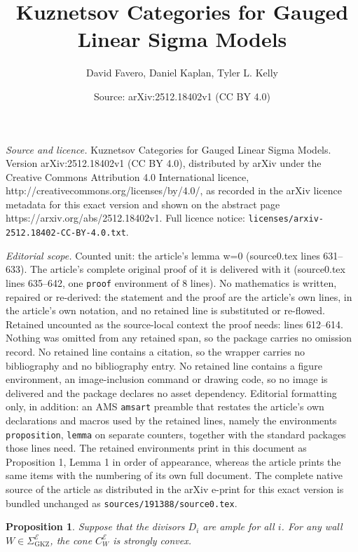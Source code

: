 \documentclass[10pt,a4paper]{amsart}
\title{Kuznetsov Categories for Gauged Linear Sigma Models}
\author{David Favero, Daniel Kaplan, Tyler L. Kelly}
\date{Source: arXiv:2512.18402v1 (CC BY 4.0)}
\newtheorem{proposition}{Proposition}
\newcommand{\op}[1]{\operatorname{#1}}
\begin{document}
\maketitle

\noindent\emph{Source and licence.} Kuznetsov Categories for Gauged Linear Sigma Models. Version arXiv:2512.18402v1 (CC BY 4.0), distributed by arXiv under the Creative Commons Attribution 4.0 International licence, http://creativecommons.org/licenses/by/4.0/, as recorded in the arXiv licence metadata for this exact version and shown on the abstract page https://arxiv.org/abs/2512.18402v1. Full licence notice: \texttt{licenses/arxiv-2512.18402-CC-BY-4.0.txt}.\par\smallskip

\noindent\textit{Editorial scope.} Counted unit: the article's lemma w=0 (source0.tex lines 631--633). The article's complete original proof of it is delivered with it (source0.tex lines 635--642, one \texttt{proof} environment of 8 lines). No mathematics is written, repaired or re-derived: the statement and the proof are the article's own lines, in the article's own notation, and no retained line is substituted or re-flowed.  Retained uncounted as the source-local context the proof needs: lines 612--614.  Nothing was omitted from any retained span, so the package carries no omission record.  No retained line contains a citation, so the wrapper carries no bibliography and no bibliography entry.  No retained line contains a figure environment, an image-inclusion command or drawing code, so no image is delivered and the package declares no asset dependency.  Editorial formatting only, in addition: an AMS \texttt{amsart} preamble that restates the article's own declarations and macros used by the retained lines, namely the environments \texttt{proposition}, \texttt{lemma} on separate counters, together with the standard packages those lines need.  The retained environments print in this document as Proposition 1, Lemma 1 in order of appearance, whereas the article prints the same items with the numbering of its own full document.  The complete native source of the article as distributed in the arXiv e-print for this exact version is bundled unchanged as \texttt{sources/191388/source0.tex}.
\begin{proposition}\label{prop:strongly convex weight cone}
Suppose that the divisors $D_i$ are ample for all $i$. For any wall $W \in \Sigma^{\mathcal E}_{\op{GKZ}}$, the cone $C^{\mathcal E}_W$ is strongly convex.
\end{proposition}
\end{document}
